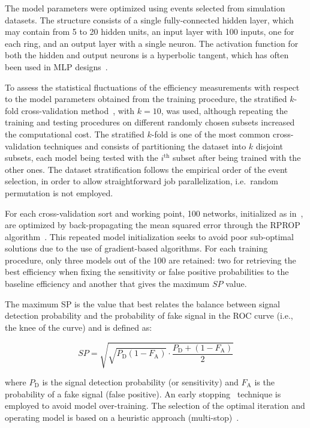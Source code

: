 The model parameters were optimized using events selected from simulation datasets. 
The structure consists of a single fully-connected hidden layer, which may contain from 5 to 20 hidden units, an input layer with 100 inputs, one for each ring, and an output layer with a single neuron. 
The activation function for both the hidden and output neurons is a hyperbolic tangent, which has often been  used in MLP designs~\cite{haykin_2008}. 

To assess the statistical fluctuations of the efficiency measurements with respect to the model parameters obtained from the training procedure, the stratified $k$-fold cross-validation method~\cite{haykin_2008}, with $k=10$, was used, although repeating the training and testing procedures on different randomly chosen subsets increased the computational cost. 
The stratified $k$-fold is one of the most common cross-validation techniques and consists of partitioning the dataset into $k$ disjoint subsets, each model being tested with the $i^\text{th}$ subset after being trained with the other ones. The dataset stratification follows the empirical order of the event selection, in order to allow straightforward job parallelization, i.e.\ random permutation is not employed. 

For each cross-validation sort and working point, 100 networks, initialized as in~\cite{initnw}, are optimized by back-propagating the mean squared error through the RPROP algorithm~\cite{rprop}. This repeated model initialization seeks to avoid poor sub-optimal solutions due to the use of gradient-based algorithms.
For each training procedure, only three models out of the 100 are retained: two for retrieving the best efficiency when fixing the sensitivity or false positive probabilities to the baseline \fastcalo{} efficiency and another that gives the maximum $SP$ value. 

The maximum SP is the value that best relates the balance between signal detection probability and the probability of fake signal in the ROC curve (i.e., the knee of the curve) and is defined as:

\begin{equation*}
SP = \sqrt{\sqrt{P_\text{D}(1-F_\text{A})}\cdot\frac{P_\text{D} + (1-F_\text{A})}{2}}
\end{equation*}


\noindent where $P_\text{D}$ is the signal detection probability (or sensitivity) and $F_\text{A}$ is the probability of a fake signal (false positive). 
An early stopping~\cite{haykin_2008} technique is employed to avoid model over-training. The selection of the optimal iteration and operating model is based on a heuristic approach (multi-stop)~\cite{Goodfellow2016}.


